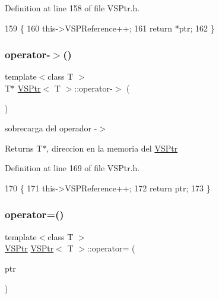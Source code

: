 Definition at line 158 of file V\+S\+Ptr.\+h.


\begin{DoxyCode}
159     \{
160         this->VSPReference++;
161         \textcolor{keywordflow}{return} *ptr;
162     \}
\end{DoxyCode}
\mbox{\label{classVSPtr_aad11db03d22be0ece564777de9415515}} 
\subsubsection{\texorpdfstring{operator-\/$>$()}{operator->()}}
{\footnotesize\ttfamily template$<$class T $>$ \\
T$\ast$ \hyperlink{classVSPtr}{V\+S\+Ptr}$<$ T $>$\+::operator-\/$>$ (\begin{DoxyParamCaption}{ }\end{DoxyParamCaption})\hspace{0.3cm}{\ttfamily [inline]}}



sobrecarga del operador -\/$>$ 

\begin{DoxyReturn}{Returns}
T$\ast$, direccion en la memoria del \hyperlink{classVSPtr}{V\+S\+Ptr} 
\end{DoxyReturn}


Definition at line 169 of file V\+S\+Ptr.\+h.


\begin{DoxyCode}
170     \{
171         this->VSPReference++;
172         \textcolor{keywordflow}{return} ptr;
173     \}
\end{DoxyCode}
\mbox{\label{classVSPtr_af568414fadd2891d8cdcede387afa657}} 
\subsubsection{\texorpdfstring{operator=()}{operator=()}}
{\footnotesize\ttfamily template$<$class T $>$ \\
\hyperlink{classVSPtr}{V\+S\+Ptr} \hyperlink{classVSPtr}{V\+S\+Ptr}$<$ T $>$\+::operator= (\begin{DoxyParamCaption}\item[{\hyperlink{classVSPtr}{V\+S\+Ptr}$<$ T $>$}]{ptr }\end{DoxyParamCaption})\hspace{0.3cm}{\ttfamily [inline]}}



